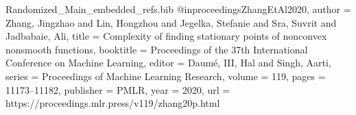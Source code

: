 \begin{filecontents*}[overwrite]{Randomized_Main_embedded_refs.bib}
@inproceedings{ZhangEtAl2020,
  author    = {Zhang, Jingzhao and Lin, Hongzhou and Jegelka, Stefanie and
               Sra, Suvrit and Jadbabaie, Ali},
  title     = {Complexity of finding stationary points of nonconvex nonsmooth
               functions},
  booktitle = {Proceedings of the 37th International Conference on Machine
               Learning},
  editor    = {Daum{\'e}, III, Hal and Singh, Aarti},
  series    = {Proceedings of Machine Learning Research},
  volume    = {119},
  pages     = {11173--11182},
  publisher = {PMLR},
  year      = {2020},
  url       = {https://proceedings.mlr.press/v119/zhang20p.html}
}

\end{filecontents*}
\documentclass[11pt]{article}

\usepackage[compress]{natbib}
\usepackage{amsmath,amssymb,amsthm}
\usepackage{color}
\usepackage[margin=1in]{geometry}
\usepackage{setspace}
\usepackage{amsthm, amsmath, amssymb, amsfonts}
\usepackage{subcaption}
\usepackage{bm}
\usepackage[dvipsnames]{xcolor}
\newcommand{\kibitz}[2]{\textcolor{#1}{#2}}
\usepackage{hyperref}
\hypersetup{ colorlinks=true, citecolor=MidnightBlue, linkcolor=red!80!black, urlcolor=MidnightBlue}
\usepackage{caption}

\usepackage{url}            %
\usepackage{booktabs}       %
\usepackage{nicefrac}       %
\usepackage{graphicx}
\usepackage{caption}
\usepackage{thm-restate}
\usepackage[export]{adjustbox}

\usepackage{microtype}
\usepackage{mathpazo} %
\linespread{1.05}        %
\usepackage[scaled]{helvet} %
\usepackage{courier} %
\normalfont
\usepackage[T1]{fontenc}


\usepackage{threeparttable}
\allowdisplaybreaks[4] %
\usepackage[shortlabels]{enumitem} 
\usepackage{needspace}

